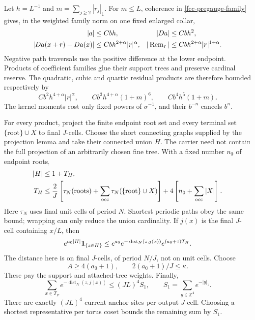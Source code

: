 \documentclass[11pt]{article}
\theoremstyle{remark}
\begin{document}
Let \(h=L^{-1}\) and \(m=\sum_{j\ge2}|r_j|_1\).
For \(m\le L\), coherence in
\eqref{fcc-pregauge-family} gives, in the weighted
family norm on one fixed enlarged collar,
\begin{align}
 |a|&\le Cbh,& |Da|&\le Cbh^2,\notag\\
 |Da(x+r)-Da(x)|&\le Cbh^{2+\alpha}|r|^\alpha,&
 |\operatorname{Rem}_r|&\le
                 Cbh^{2+\alpha}|r|^{1+\alpha}.
 \label{fcc-near-estimates}
\end{align}
Negative path traversals use the positive difference
at the lower endpoint. Products of coefficient families
glue their support trees and preserve cardinal reserve.
The quadratic, cubic and quartic residual products
are therefore bounded respectively by
\[
 Cb^2h^{4+\alpha}|r|^\alpha,\qquad
 Cb^3h^{4+\alpha}(1+m)^6,\qquad
 Cb^4h^5(1+m).
\]
The kernel moments cost only fixed powers of
\(\sigma^{-1}\), and their \(b^{-n}\) cancels \(b^n\).

For every product, project the finite endpoint root
set and every terminal set \(\{\text{root}\}\cup X\)
to final \(J\)-cells. Choose the short connecting
graphs supplied by the projection lemma and take
their connected union \(H\). The carrier need not
contain the full projection of an arbitrarily chosen
fine tree. With a fixed number \(n_0\) of endpoint
roots,
\begin{align}
 |H|&\le1+T_H,\notag\\
 T_H&\le\frac2J\left[
          \tau_N(\text{roots})
           +\sum_{\rm occ}\tau_N(\{\text{root}\}\cup X)\right]
             +4\left[n_0+\sum_{\rm occ}|X|\right].
 \label{fcc-carrier-geometry}
\end{align}
Here \(\tau_N\) uses final unit cells of period \(N\).
Shortest periodic paths obey the same bound; wrapping
can only reduce the union cardinality. If \(j(x)\)
is the final \(J\)-cell containing \(x/L\), then
\begin{equation}
 e^{a_0|H|}{\bf1}_{\{z\in H\}}
 \le e^{a_0}e^{-\operatorname{dist}_N(z,j(x))}
                         e^{(a_0+1)T_H}.
 \label{fcc-reroot}
\end{equation}
The distance here is on final \(J\)-cells, of period
\(N/J\), not on unit cells. Choose
\begin{equation}
 A\ge4(a_0+1),\qquad 2(a_0+1)/J\le\kappa.
 \label{fcc-reserve}
\end{equation}
These pay the support and attached-tree weights.
Finally,
\begin{equation}
 \sum_{x\in T_P}e^{-\operatorname{dist}_N(z,j(x))}
       \le(JL)^4 S_1,\qquad
 S_1=\sum_{y\in\mathbb Z^4}e^{-|y|_1}.
 \label{fcc-anchor-count}
\end{equation}
There are exactly \((JL)^4\) current anchor sites per
output \(J\)-cell. Choosing a shortest representative
per torus coset bounds the remaining sum by \(S_1\).
\end{document}
